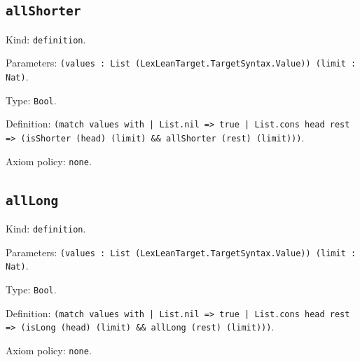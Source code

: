 \documentclass[11pt]{article}
\begin{document}
\subsection*{\texttt{allShorter}}
\noindent Kind: \texttt{definition}.\par
\noindent Parameters: \texttt{(values : List (LexLeanTarget.TargetSyntax.Value)) (limit : Nat)}.\par
\noindent Type: \texttt{Bool}.\par
\noindent Definition: \texttt{(match values with | List.nil => true | List.cons head rest => (isShorter (head) (limit) \&\& allShorter (rest) (limit)))}.\par
\noindent Axiom policy: \texttt{none}.\par
\subsection*{\texttt{allLong}}
\noindent Kind: \texttt{definition}.\par
\noindent Parameters: \texttt{(values : List (LexLeanTarget.TargetSyntax.Value)) (limit : Nat)}.\par
\noindent Type: \texttt{Bool}.\par
\noindent Definition: \texttt{(match values with | List.nil => true | List.cons head rest => (isLong (head) (limit) \&\& allLong (rest) (limit)))}.\par
\noindent Axiom policy: \texttt{none}.\par
\end{document}
